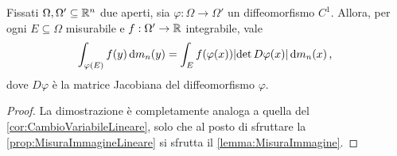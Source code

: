 \begin{theorem}\label{thm:CambioVariabile}
	Fissati $\Omega,\Omega'\subseteq\mathbb R^n$ due aperti, sia $\varphi:\Omega\to\Omega'$ un diffeomorfismo $C^1$.
	Allora, per ogni $E\subseteq \Omega$ misurabile e $f:\Omega'\to\mathbb R$ integrabile, vale
	\begin{equation*}
		\int_{\varphi(E)} f(y)\,\mathrm d m_n(y) = \int_{E} f(\varphi(x))\lvert \det D\varphi(x) \rvert \,\mathrm d m_n(x) \, \text{, }
	\end{equation*}
	dove $D\varphi$ è la matrice Jacobiana del diffeomorfismo $\varphi$.
\end{theorem}
\begin{proof}
	La dimostrazione è completamente analoga a quella del \cref{cor:CambioVariabileLineare}, solo che al posto di sfruttare la \cref{prop:MisuraImmagineLineare} si sfrutta il \cref{lemma:MisuraImmagine}.
\end{proof}

